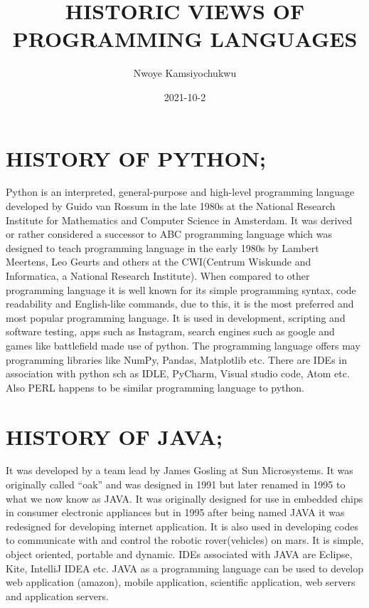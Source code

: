 \documentclass{article}
\title{HISTORIC VIEWS OF PROGRAMMING LANGUAGES}
\date{2021-10-2}
\author{Nwoye Kamsiyochukwu}
\begin{document}
	\maketitle
	\newpage
	
	\section{HISTORY OF PYTHON;}
	Python is an interpreted, general-purpose and high-level programming language developed by Guido van Rossum in the late 1980s at the National Research Institute for Mathematics and Computer Science in Amsterdam.
	It was derived or rather considered a successor to ABC programming language which was designed to teach programming language in the early 1980s by Lambert Meertens, Leo Geurts and others at the CWI(Centrum Wiskunde and Informatica, a National Research Institute).
	When compared to other programming language it is well known for its simple programming syntax, code readability and English-like commands, due to this, it is the most preferred and most popular programming language. 
	It is used in  development, scripting and software testing, apps such as Instagram, search engines such as google and games like battlefield made use of python. 
	The programming language offers may programming libraries like NumPy, Pandas, Matplotlib etc. There are IDEs in association with python sch as IDLE, PyCharm, Visual studio code, Atom etc. Also PERL happens to be similar programming language to python.
	

	\section{HISTORY OF JAVA;}
	It was developed by a team lead by James Gosling at Sun Microsystems. It was originally called “oak” and was designed in 1991 but later renamed in 1995 to what we now know as JAVA.
	It was originally designed for use in embedded chips in consumer electronic appliances but in 1995 after being named JAVA it was redesigned for developing internet application. It is also used in developing codes to communicate with and control the robotic rover(vehicles) on mars.
	It is simple, object oriented, portable and dynamic.
	IDEs associated with JAVA are Eclipse, Kite, IntelliJ IDEA etc.
	JAVA as a programming language can be used to develop web application (amazon), mobile application, scientific application, web servers and application servers.
	\newpage
\end{document}
